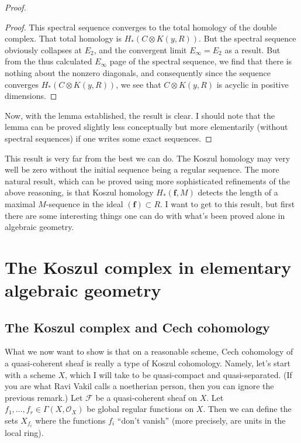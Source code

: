 \documentclass{article}
\begin{document}
\begin{proof}
\begin{proof}
This spectral sequence converges to the total homology of the double complex.
That total homology is $H_*(C \otimes K(y,R))$. But the spectral sequence
obviously collapses at $E_2$, and the convergent limit $E_\infty = E_2$ as a
result. But from the  thus calculated $E_\infty$ page of the
spectral sequence, we find that there is nothing about the nonzero diagonals,
and consequently since the sequence converges $H_*(C \otimes K(y,R))$, we see
that $C \otimes K(y,R)$ is acyclic in positive dimensions.
\end{proof}

Now, with the lemma established, the result is clear. I should note that the
lemma can be proved slightly less conceptually but more elementarily (without
spectral sequences) if one writes some exact sequences. 

\end{proof} 


This result is very far from the best we can do. The Koszul homology may very
well be zero without the initial sequence being a regular sequence. The more
natural result, which can be proved using more sophisticated refinements of the
above reasoning, is that Koszul homology $H_*(\mathbf{f}, M)$ detects the length of a maximal
$M$-sequence in the ideal $(\mathbf{f}) \subset R$. I want to get to this
result, but first there are some interesting things one can do with what's been
proved alone in algebraic geometry.	

\section{The Koszul complex in elementary algebraic geometry}

\subsection{The Koszul complex and Cech cohomology}

What we now want to show is that on a reasonable scheme, Cech cohomology of a
quasi-coherent sheaf is really a type of Koszul cohomology. 
Namely, let's start with a scheme $X$, which I will take to be quasi-compact
and quasi-separated. (If you are what Ravi Vakil calls a noetherian person,
then you can ignore the previous remark.) Let $\mathcal{F}$ be a quasi-coherent
sheaf on $X$. Let $f_1, \dots, f_r \in \Gamma(X, \mathcal{O}_X)$ be 
global regular functions on $X$. Then we can define the sets $X_{f_i}$ where
the functions $f_i$ ``don't vanish'' (more precisely, are units in the local
ring). 
\end{document}
